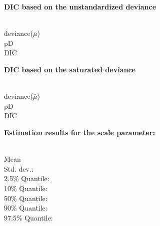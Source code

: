 \documentclass[a4paper, 12pt]{article}
\begin{document}
{\bf DIC based on the unstandardized deviance } 

\vspace{-0.4cm}
\begin{tabbing}
\hspace{3cm} \= \\
deviance($\bar{\mu}$)  \\
pD   \\
DIC   \\
\end{tabbing}

{\bf DIC based on the saturated deviance } 

\vspace{-0.4cm}
\begin{tabbing}
\hspace{3cm} \= \\
deviance($\bar{\mu}$)  \\
pD  \\
DIC  \\
\end{tabbing}


 {\bf \large Estimation results for the scale parameter: }\\ 

\vspace{-0.4cm}
\begin{tabbing}
\hspace{3cm} \= \\
Mean   \\
Std. dev.:   \\
  2.5\% Quantile:   \\
  10\% Quantile:   \\
  50\% Quantile:   \\
  90\% Quantile:   \\
  97.5\% Quantile:   \\
\end{tabbing}


\newpage 
\end{document}

